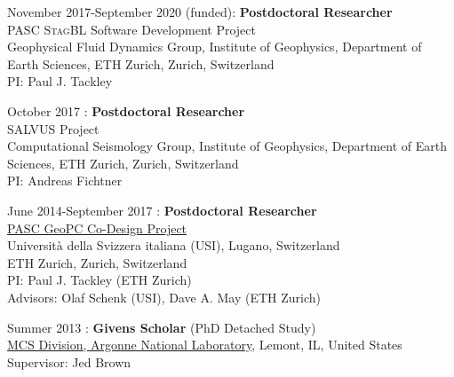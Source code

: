 
\begin{samepage}
\noindent November 2017-September 2020 (funded): \textbf{Postdoctoral Researcher} \\
PASC \textsc{StagBL} Software Development Project \\
Geophysical Fluid Dynamics Group, Institute of Geophysics, Department of Earth Sciences, ETH Zurich, Zurich, Switzerland \\
PI: Paul J. Tackley \\
\end{samepage}

\begin{samepage}
\noindent October 2017 : \textbf{Postdoctoral Researcher}\\
\textsc{SALVUS} Project\\
Computational Seismology Group, Institute of Geophysics, Department of Earth Sciences, ETH Zurich, Zurich, Switzerland \\
PI: Andreas Fichtner \\
\end{samepage}

\begin{samepage}
\noindent June 2014-September 2017 : \textbf{Postdoctoral Researcher} \\
\href{http://www.pasc-ch.org/projects/projects/geopc/}{PASC GeoPC Co-Design Project} \\
Universit\`{a} della Svizzera italiana (USI), Lugano, Switzerland \\
ETH Zurich, Zurich, Switzerland \\
PI: Paul J. Tackley (ETH Zurich) \\
Advisors: Olaf Schenk (USI), Dave A. May (ETH Zurich) \\

\end{samepage}

\begin{samepage}
\noindent Summer 2013 : \textbf{Givens Scholar} (PhD Detached Study) \\
\href{http://www.mcs.anl.gov}{MCS Division, Argonne National Laboratory}, Lemont, IL, United States \\
Supervisor: Jed Brown \\
\end{samepage}

